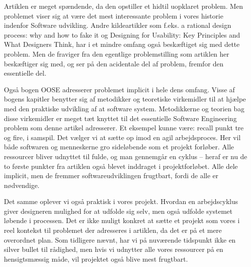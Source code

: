 \documentclass[a4paper,12pt]{article}
\begin{document}
Artiklen er meget spændende, da den opstiller et hidtil uopklaret problem. Men problemet viser sig at være det mest interessante problem i vores historie indenfor Software udvikling. Andre kildeartikler som f.eks. a rational design process: why and how to fake it og Designing for Usability: Key Principles and What Designers Think, har i et mindre omfang også beskæftiget sig med dette problem. Men de fraviger fra den egentlige problemstilling som artiklen her beskæftiger sig med, og ser på den acidentale del af problem, fremfor den essentielle del.

Også bogen OOSE adresserer problemet implicit i hele dens omfang. Visse af bogens kapitler benytter sig af metodikker og teoretiske virkemidler til at hjælpe med den praktiske udvikling af at software system. Metodikkerne og teorien bag disse virkemidler er meget tæt knyttet til det essentielle Software Engineering problem som denne artikel adresserer. Et eksempel kunne være: recall punkt tre og fire, i samspil.  Det vælger vi at sætte op imod en agil arbejdsproces. Her vil både softwaren og menneskerne gro sideløbende som et projekt forløber. Alle ressourcer bliver udnyttet til fulde, og man gennemgår en cyklus – heraf er nu de to første punkter fra artiklen også blevet inddraget i projektforløbet. Alle dele implicit, men de fremmer softwareudviklingen frugtbart, fordi de alle er nødvendige.

Det samme oplever vi også praktisk i vores projekt. Hvordan en arbejdscyklus giver designeren mulighed for at udfolde sig selv, men også udfolde systemet løbende i processen. Det er ikke muligt konkret at sætte et projekt som vores i reel kontekst til problemet der adresseres i artiklen, da det er på et mere overordnet plan. Som tidligere nævnt, har vi på nuværende tidspunkt ikke en silver bullet til rådighed, men hvis vi udnytter alle vores ressourcer på en hensigtsmæssig måde, vil projektet også blive mest frugtbart.   
\end{document}
